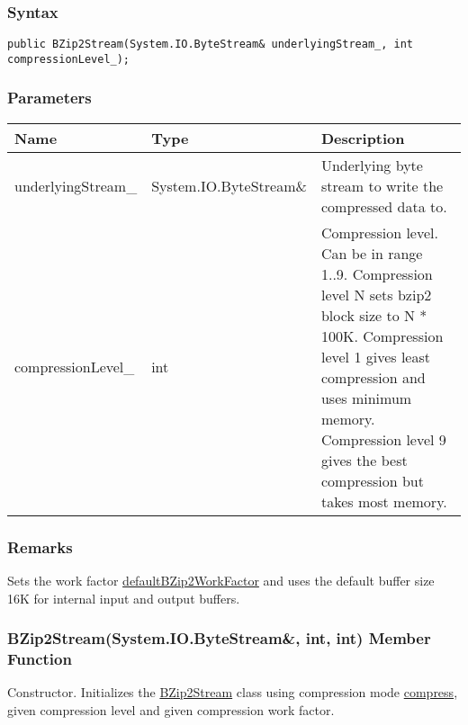 \documentclass[a4paper,oneside,11.000000pt]{book}
\begin{document}
\subsubsection*{Syntax}
\texttt{public BZip2Stream(System.IO.ByteStream\& underlyingStream\_, int compressionLevel\_);}
\subsubsection*{Parameters}
\begin{flushleft}
\begin{supertabular}[l]{!{\raggedright}p{4.10323cm}!{\raggedright}p{5.76344cm}!{\raggedright}p{4.93333cm}}
\textbf{Name}
& \textbf{Type}
& \textbf{Description}
\\
\hline
underlyingStream\_
& System.\-IO.\-ByteStream\&\-
& Underlying byte stream to write the compressed data to.

\\
compressionLevel\_
& int
& Compression level. Can be in range 1..9. Compression level N sets bzip2 block size to N * 100K. Compression level 1 gives least compression and uses minimum memory.
Compression level 9 gives the best compression but takes most memory.

\\
\end{supertabular}

\end{flushleft}
\subsubsection*{Remarks}
\begin{flushleft}
Sets the work factor \hyperlink{System.IO.Compression.defaultBZip2WorkFactor}{defaultBZip2WorkFactor} and uses the default buffer size 16K for internal input and output buffers.

\end{flushleft}
\clearpage

\hypertarget{System.IO.Compression.BZip2Stream.constructor.P.System.IO.Compression.BZip2Stream.R.System.IO.ByteStream.int.int}{\subsubsection*{BZip2Stream(System.IO.ByteStream\&, int, int) Member Function}}
\begin{flushleft}
Constructor. Initializes the \hyperlink{System.IO.Compression.BZip2Stream}{BZip2Stream} class using compression mode \hyperlink{System.IO.Compression.CompressionMode.compress}{compress},
given compression level and given compression work factor.

\end{flushleft}
\end{document}
